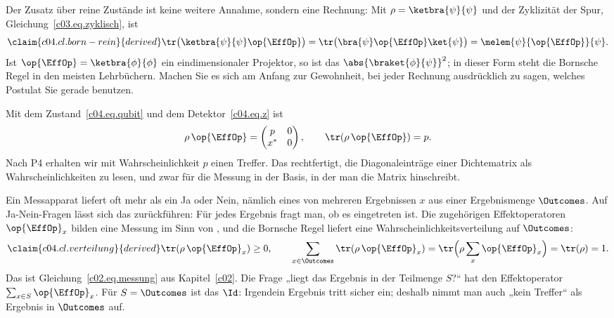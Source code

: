 Der Zusatz über reine Zustände ist keine weitere Annahme, sondern eine Rechnung: Mit
$\rho = \ketbra{\psi}{\psi}$ und der Zyklizität der Spur, Gleichung~\eqref{c03.eq.zyklisch}, ist
\begin{equation}\label{c04.eq.born-rein}\claim{c04.cl.born-rein}{derived}
  \tr\bigl(\ketbra{\psi}{\psi}\op{\EffOp}\bigr) = \tr\bigl(\bra{\psi}\op{\EffOp}\ket{\psi}\bigr) = \melem{\psi}{\op{\EffOp}}{\psi} .
\end{equation}
Ist $\op{\EffOp} = \ketbra{\phi}{\phi}$ ein eindimensionaler Projektor, so ist das
$\abs{\braket{\phi}{\psi}}^2$; in dieser Form steht die Bornsche Regel in den meisten Lehrbüchern.
Machen Sie es sich am Anfang zur Gewohnheit, bei jeder Rechnung ausdrücklich zu sagen, welches
Postulat Sie gerade benutzen.

\begin{example}\label{c04.ex.born}
  Mit dem Zustand~\eqref{c04.eq.qubit} und dem Detektor~\eqref{c04.eq.z} ist
  \begin{equation}\label{c04.eq.born-z}
    \rho\,\op{\EffOp} = \begin{pmatrix} p & 0 \\ x^* & 0 \end{pmatrix} ,
    \qquad
    \tr(\rho\,\op{\EffOp}) = p .
  \end{equation}
  Nach P4 erhalten wir mit Wahrscheinlichkeit $p$ einen Treffer. Das rechtfertigt, die
  Diagonaleinträge einer Dichtematrix als Wahrscheinlichkeiten zu lesen, und zwar für die Messung
  in der Basis, in der man die Matrix hinschreibt.
\end{example}

Ein Messapparat liefert oft mehr als ein Ja oder Nein, nämlich eines von mehreren Ergebnissen $x$
aus einer Ergebnismenge $\Outcomes$. Auf Ja-Nein-Fragen lässt sich das zurückführen: Für jedes
Ergebnis fragt man, ob es eingetreten ist. Die zugehörigen Effektoperatoren $\op{\EffOp}_x$ bilden
eine Messung im Sinn von , und die Bornsche Regel liefert eine
Wahrscheinlichkeitsverteilung auf $\Outcomes$:
\begin{equation}\label{c04.eq.verteilung}\claim{c04.cl.verteilung}{derived}
  \tr(\rho\,\op{\EffOp}_x) \geq 0 ,
  \qquad
  \sum_{x \in \Outcomes} \tr(\rho\,\op{\EffOp}_x) = \tr\Bigl(\rho \sum_{x} \op{\EffOp}_x\Bigr) = \tr(\rho) = 1 .
\end{equation}
Das ist Gleichung~\eqref{c02.eq.messung} aus Kapitel~\ref{c02}. Die Frage „liegt das Ergebnis in der
Teilmenge $S$?“ hat den Effektoperator $\sum_{x \in S} \op{\EffOp}_x$. Für $S = \Outcomes$ ist das $\Id$:
Irgendein Ergebnis tritt sicher ein; deshalb nimmt man auch „kein Treffer“ als Ergebnis in
$\Outcomes$ auf.

